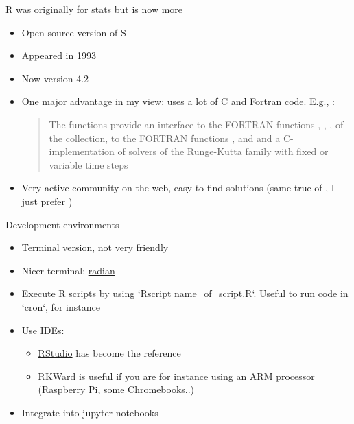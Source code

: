 \documentclass[aspectratio=169]{beamer}\usepackage[]{graphicx}\usepackage[]{xcolor}
\begin{document}
\begin{frame}{R was originally for stats but is now more}
\begin{itemize}
\item Open source version of S \vfill
\item Appeared in 1993 \vfill
\item Now version 4.2 \vfill
\item One major advantage in my view: uses a lot of C and Fortran code. E.g., :
\begin{quote}
    The functions provide an interface to the FORTRAN functions , , ,  of the  collection, to the FORTRAN functions ,  and  and a C-implementation of solvers of the Runge-Kutta family with fixed or variable time steps  
\end{quote} \vfill
\item Very active community on the web, easy to find solutions (same true of , I just prefer )
\end{itemize}
\end{frame} 

\begin{frame}{Development environments}
\begin{itemize}
    \item Terminal version, not very friendly \vfill
    \item Nicer terminal: \href{https://github.com/randy3k/radian}{radian} \vfill
    \item Execute R scripts by using `Rscript name\_of\_script.R`. Useful to run code in `cron`, for instance \vfill
    \item Use IDEs:
    \begin{itemize}
        \item \href{https://www.rstudio.com/products/rstudio/}{RStudio} has become the reference
        \item \href{https://invent.kde.org/education/rkward}{RKWard} is useful if you are for instance using an ARM processor (Raspberry Pi, some Chromebooks..)
    \end{itemize} \vfill
    \item Integrate into jupyter notebooks
\end{itemize}
\end{frame} 
\end{document}
